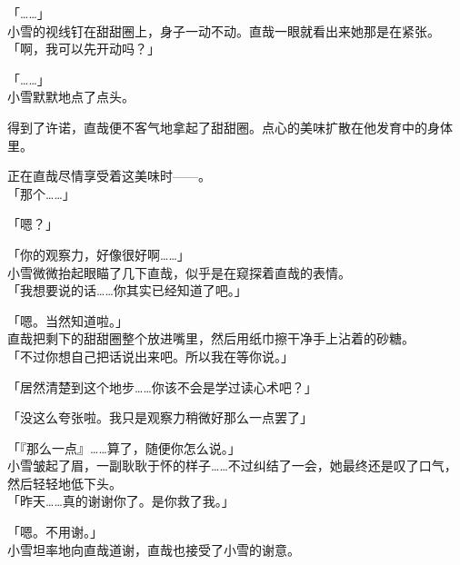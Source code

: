 「……」\\

小雪的视线钉在甜甜圈上，身子一动不动。直哉一眼就看出来她那是在紧张。\\

「啊，我可以先开动吗？」

「……」\\

小雪默默地点了点头。

得到了许诺，直哉便不客气地拿起了甜甜圈。点心的美味扩散在他发育中的身体里。

正在直哉尽情享受着这美味时——。\\

「那个……」

「嗯？」

「你的观察力，好像很好啊……」\\

小雪微微抬起眼瞄了几下直哉，似乎是在窥探着直哉的表情。\\

「我想要说的话……你其实已经知道了吧。」

「嗯。当然知道啦。」\\

直哉把剩下的甜甜圈整个放进嘴里，然后用纸巾擦干净手上沾着的砂糖。\\

「不过你想自己把话说出来吧。所以我在等你说。」

「居然清楚到这个地步……你该不会是学过读心术吧？」

「没这么夸张啦。我只是观察力稍微好那么一点罢了」

「『那么一点』……算了，随便你怎么说。」\\

小雪皱起了眉，一副耿耿于怀的样子……不过纠结了一会，她最终还是叹了口气，然后轻轻地低下头。\\

「昨天……真的谢谢你了。是你救了我。」

「嗯。不用谢。」\\

小雪坦率地向直哉道谢，直哉也接受了小雪的谢意。
